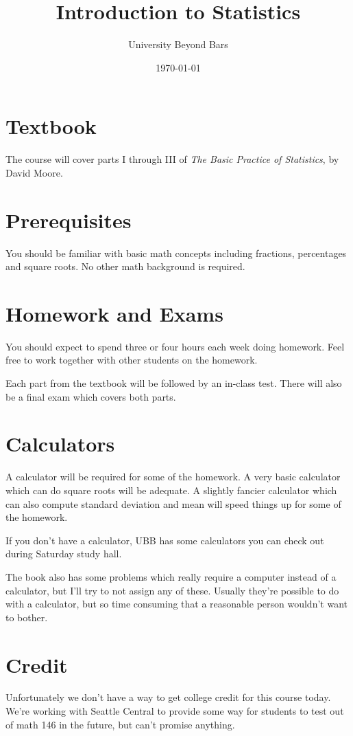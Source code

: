 \documentclass[fleqn, onecolumn]{article}
\title{Introduction to Statistics}
\author{University Beyond Bars}
\date{\today}
\begin{document}
  \maketitle

  \section{Textbook}
  The course will cover parts I through III of {\em The Basic Practice of Statistics}, by David Moore.  

  \section{Prerequisites}
  You should be familiar with basic math concepts including fractions, percentages and square roots.  No other math
  background is required.

  \section{Homework and Exams}

  You should expect to spend three or four hours each week doing homework.  Feel free to work together with other students
  on the homework.

  Each part from the textbook will be followed by an in-class test.  There will also be a final exam which covers both parts.

  \section{Calculators}
  A calculator will be required for some of the homework.  A very basic calculator which can do square roots will be
  adequate.  A slightly fancier calculator which can also compute standard deviation and mean will speed things up for
  some of the homework.

  If you don't have a calculator, UBB has some calculators you can check out during Saturday study hall.  

  The book also has some problems which really require a computer instead of a calculator, but I'll try to not assign
  any of these.  Usually they're possible to do with a calculator, but so time consuming that a reasonable person
  wouldn't want to bother.  

  \section{Credit}
  Unfortunately we don't have a way to get college credit for this course today.  We're working with Seattle Central to
  provide some way for students to test out of math 146 in the future, but can't promise anything.
\end{document}
